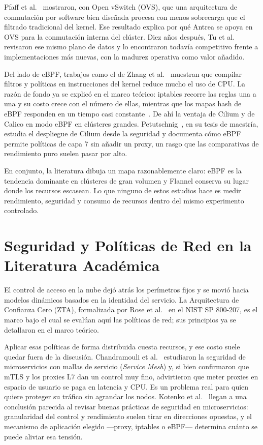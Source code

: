 Pfaff et al.~\cite{ref22} mostraron, con Open vSwitch (OVS), que una arquitectura de conmutación por software bien diseñada procesa con menos sobrecarga que el filtrado tradicional del kernel. Ese resultado explica por qué Antrea se apoya en OVS para la conmutación interna del clúster. Diez años después, Tu et al.~\cite{ref11} revisaron ese mismo plano de datos y lo encontraron todavía competitivo frente a implementaciones más nuevas, con la madurez operativa como valor añadido.

Del lado de eBPF, trabajos como el de Zhang et al.~\cite{ref27} muestran que compilar filtros y políticas en instrucciones del kernel reduce mucho el uso de CPU. La razón de fondo ya se explicó en el marco teórico: iptables recorre las reglas una a una y su costo crece con el número de ellas, mientras que los mapas hash de eBPF responden en un tiempo casi constante~\cite{ref38}. De ahí la ventaja de Cilium y de Calico en modo eBPF en clústeres grandes. Petutschnig~\cite{ref10}, en su tesis de maestría, estudia el despliegue de Cilium desde la seguridad y documenta cómo eBPF permite políticas de capa 7 sin añadir un proxy, un rasgo que las comparativas de rendimiento puro suelen pasar por alto.

En conjunto, la literatura dibuja un mapa razonablemente claro: eBPF es la tendencia dominante en clústeres de gran volumen y Flannel conserva su lugar donde los recursos escasean. Lo que ninguno de estos estudios hace es medir rendimiento, seguridad y consumo de recursos dentro del mismo experimento controlado.

\section{Seguridad y Políticas de Red en la Literatura Académica}

El control de acceso en la nube dejó atrás los perímetros fijos y se movió hacia modelos dinámicos basados en la identidad del servicio. La Arquitectura de Confianza Cero (ZTA), formalizada por Rose et al.~\cite{ref24} en el NIST SP 800-207, es el marco bajo el cual se evalúan aquí las políticas de red; sus principios ya se detallaron en el marco teórico.

Aplicar esas políticas de forma distribuida cuesta recursos, y ese costo suele quedar fuera de la discusión. Chandramouli et al.~\cite{ref26} estudiaron la seguridad de microservicios con mallas de servicio (\emph{Service Mesh}) y, si bien confirmaron que mTLS y los proxies L7 dan un control muy fino, advirtieron que meter proxies en espacio de usuario se paga en latencia y CPU. Es un problema real para quien quiere proteger su tráfico sin agrandar los nodos. Kotenko et al.~\cite{ref16} llegan a una conclusión parecida al revisar buenas prácticas de seguridad en microservicios: granularidad del control y rendimiento suelen tirar en direcciones opuestas, y el mecanismo de aplicación elegido ---proxy, iptables o eBPF--- determina cuánto se puede aliviar esa tensión.

